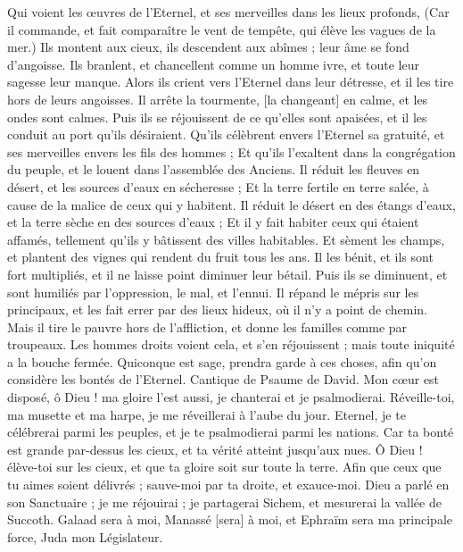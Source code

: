 \begin{multicols}{2}
Qui voient les œuvres de l'Eternel, et ses merveilles dans les lieux profonds,
(Car il commande, et fait comparaître le vent de tempête, qui élève les vagues de la mer.)
Ils montent aux cieux, ils descendent aux abîmes ; leur âme se fond d'angoisse.
Ils branlent, et chancellent comme un homme ivre, et toute leur sagesse leur manque.
Alors ils crient vers l'Eternel dans leur détresse, et il les tire hors de leurs angoisses.
Il arrête la tourmente, [la changeant] en calme, et les ondes sont calmes.
Puis ils se réjouissent de ce qu'elles sont apaisées, et il les conduit au port qu'ils désiraient.
Qu'ils célèbrent envers l'Eternel sa gratuité, et ses merveilles envers les fils des hommes ;
Et qu'ils l'exaltent dans la congrégation du peuple, et le louent dans l'assemblée des Anciens.
Il réduit les fleuves en désert, et les sources d'eaux en sécheresse ;
Et la terre fertile en terre salée, à cause de la malice de ceux qui y habitent.
Il réduit le désert en des étangs d'eaux, et la terre sèche en des sources d'eaux ;
Et il y fait habiter ceux qui étaient affamés, tellement qu'ils y bâtissent des villes habitables.
Et sèment les champs, et plantent des vignes qui rendent du fruit tous les ans.
Il les bénit, et ils sont fort multipliés, et il ne laisse point diminuer leur bétail.
Puis ils se diminuent, et sont humiliés par l'oppression, le mal, et l'ennui.
Il répand le mépris sur les principaux, et les fait errer par des lieux hideux, où il n'y a point de chemin.
Mais il tire le pauvre hors de l'affliction, et donne les familles comme par troupeaux.
Les hommes droits voient cela, et s'en réjouissent ; mais toute iniquité a la bouche fermée.
Quiconque est sage, prendra garde à ces choses, afin qu'on considère les bontés de l'Eternel.
\VerseOne{}Cantique de Psaume de David. Mon cœur est disposé, ô Dieu ! ma gloire l'est aussi, je chanterai et je psalmodierai.
Réveille-toi, ma musette et ma harpe, je me réveillerai à l'aube du jour.
Eternel, je te célébrerai parmi les peuples, et je te psalmodierai parmi les nations.
Car ta bonté est grande par-dessus les cieux, et ta vérité atteint jusqu’aux nues.
Ô Dieu ! élève-toi sur les cieux, et que ta gloire soit sur toute la terre.
Afin que ceux que tu aimes soient délivrés ; sauve-moi par ta droite, et exauce-moi.
Dieu a parlé en son Sanctuaire ; je me réjouirai ; je partagerai Sichem, et mesurerai la vallée de Succoth.
Galaad sera à moi, Manassé [sera] à moi, et Ephraïm sera ma principale force, Juda mon Législateur.

\end{multicols}
